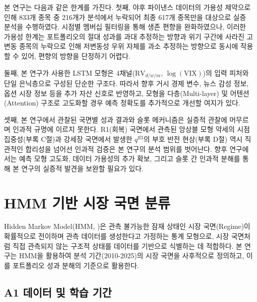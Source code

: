 \documentclass{article}
\begin{document}
본 연구는 다음과 같은 한계를 가진다. 첫째, 야후 파이낸스 데이터의 가용성 제약으로 인해 833개 종목 중 216개가 분석에서 누락되어 최종 617개 종목만을 대상으로 실증 분석을 수행하였다. 시점별 멤버십 필터링을 통해 생존 편향을 완화하였으나, 이러한 가용성 한계는 포트폴리오의 절대 성과를 과대 추정하는 방향과 위기 구간에 사라진 고변동 종목의 누락으로 인해 저변동성 우위 자체를 과소 추정하는 방향으로 동시에 작용할 수 있어, 편향의 방향을 단정하기 어렵다.

둘째, 본 연구가 사용한 LSTM 모형은 4채널($\mathrm{RV}_{d/w/m}$, $\log(\mathrm{VIX})$)의 입력 피처와 단일 은닉층으로 구성된 단순한 구조다. 따라서 향후 거시 경제 변수, 뉴스 감성 정보, 옵션 시장 정보 등을 추가 자산 신호로 반영하고, 모형을 다층(Multi-layer) 및 어텐션(Attention) 구조로 고도화할 경우 예측 정확도를 추가적으로 개선할 여지가 있다.

셋째, 본 연구에서 관찰된 국면별 성과 결과와 슬롯 메커니즘은 실증적 관찰에 머무르며 인과적 규명에 이르지 못한다. R1(회복) 국면에서 관측된 앙상블 모형 약세의 시점 집중성(부록 C절)과 강세장 국면에서 발생한 $q^{\mathrm{ff3}}$의 부호 반전 현상(부록 D절) 역시 직관적인 합리성을 넘어선 인과적 검증은 본 연구의 분석 범위를 벗어난다. 향후 연구에서는 예측 모형 고도화, 데이터 가용성의 추가 확보, 그리고 슬롯 간 인과적 분해를 통해 본 연구의 실증적 발견을 보완할 필요가 있다.












\appendix
\renewcommand{\thesection}{부록 \Alph{section}}
\renewcommand{\thefigure}{A.\arabic{figure}}
\renewcommand{\thetable}{A.\arabic{table}}
\setcounter{figure}{0}
\setcounter{table}{0}

\section{HMM 기반 시장 국면 분류}\label{app:hmm}

Hidden Markov Model(HMM, \citealp{hamilton1989new})은 관측 불가능한 잠재 상태인 시장 국면(Regime)이 확률적으로 전이하며 관측 데이터를 생성한다고 가정하는 통계 모형으로, 시장 국면처럼 직접 관측되지 않는 구조적 상태를 데이터를 기반으로 식별하는 데 적합하다. 본 연구는 HMM을 활용하여 분석 기간(2010-2025)의 시장 국면을 사후적으로 정의하고, 이를 포트폴리오 성과 분해의 기준으로 활용한다.

\subsection*{A1 데이터 및 학습 기간}
\end{document}
